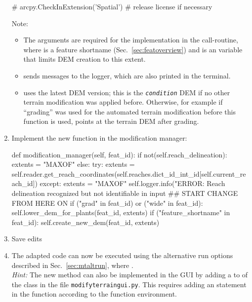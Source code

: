 \begin{enumerate}
\begin{python}
    # arcpy.CheckInExtension('Spatial')  # release license if necessary
\end{python}
	Note:
	\begin{itemize}
		\item The  arguments are required for the implementation in the call-routine, where  is a feature shortname (Sec.~\ref{sec:featoverview}) and  is an  variable that limits DEM creation to this extent.
		\item {} sends messages to the logger, which are also printed in the terminal.
		\item {} uses the latest DEM version; this is the \texttt{\textit{condition}} DEM if no other terrain modification was applied before. Otherwise, for example if ``grading'' was used for the automated terrain modification before this function is used,  points at the terrain DEM after grading.
	\end{itemize}
	\item Implement the new function in the modification manager:\\
	\begin{python}
  def modification_manager(self, feat_id):
    if not(self.reach_delineation):
      extents = "MAXOF"
    else:
      try:
        extents = self.reader.get_reach_coordinates(self.reaches.dict_id_int_id[self.current_reach_id])
      except:
        extents = "MAXOF"
        self.logger.info("ERROR: Reach delineation recognized but not identifiable in input
      ## START CHANGE FROM HERE ON
      if ("grad" in feat_id) or ("wide" in feat_id):
        self.lower_dem_for_plants(feat_id, extents)
      if ("feature_shortname" in feat_id):
        self.create_new_dem(feat_id, extents)
	\end{python}
	\item Save edits
	\item The adapted code can now be executed using the alternative run options described in Sec.~\ref{sec:mtaltrun}, where .\\
	\textit{Hint:} The new method can also be implemented in the GUI by adding a  to  of the  class in the file \texttt{modify{\myUnderscore}terrain{\myUnderscore}gui.py}. This requires adding an  statement in the  function according to the function environment.
\end{enumerate}
